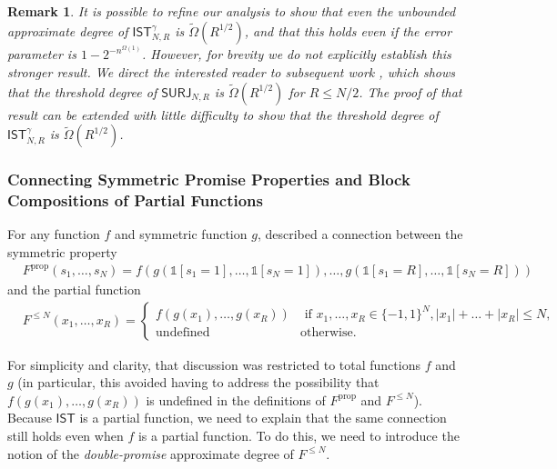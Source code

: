 \documentclass[11pt, letterpaper, fleqn]{article}
\newtheorem{remark}{Remark}
\theoremstyle{plain}
\newcommand{\SURJ}{\mathsf{ SURJ}}
\newcommand{\SE}{\mathsf{ IST}}
\newcommand{\bits}{\{-1,1\}}
\newcommand{\tOmega}{\tilde{\Omega}}
\newcommand{\id}{{\mathds{1}}}
\begin{document}
 
 \begin{remark}
 It is possible to refine our analysis to show that even the \emph{unbounded} approximate degree of $\SE_{N, R}^{\gamma}$ is $\tOmega(R^{1/2})$, and that this holds even if the error parameter is $1-2^{-n^{\Omega(1)}}$. 
 However, for brevity we do not explicitly establish this stronger result. We direct the interested reader to subsequent work
 \cite{btlargeerror}, which shows that the threshold
 degree of $\SURJ_{N, R}$ is $\tOmega(R^{1/2})$ for $R \leq N/2$. The proof of that result 
 can be extended with little difficulty to show that the threshold degree of $\SE_{N, R}^{\gamma}$ is $\tOmega(R^{1/2})$.
 \end{remark}
 

\subsubsection{Connecting Symmetric Promise Properties and Block Compositions of Partial Functions}
For any function $f$ and symmetric function $g$,  described a connection between the symmetric
property
\begin{align*}
&F^{\operatorname{prop}}(s_1, \dots, s_N) = f(g(\id[s_1 = 1], \dots, \id[s_N = 1]), \dots, g(\id[s_1=R], \dots,\id[s_N=R]))
\end{align*}
and the partial function 
\begin{align*}
&F^{\le N}(x_1, \dots, x_R) = \begin{cases} f(g(x_1), \dots, g(x_R)) & \text{ if } x_1, \dots, x_R \in \bits^N,  |x_1| + \dots + |x_R| \le N,\\
\text{undefined} & \text{otherwise}.
\end{cases}
\end{align*}

For simplicity and clarity, that discussion was restricted to total functions $f$ and $g$
(in particular, this avoided having to address the possibility that $f(g(x_1), \dots, g(x_R))$ 
is undefined in the definitions of $F^{\operatorname{prop}}$ and $F^{\leq N}$).
Because $\SE$ is a partial function, we need to explain
that the same connection still holds even when $f$ is a partial function.
To do this, we need to introduce the notion of the \emph{double-promise} approximate degree of $F^{\le N}$. 
\end{document}
